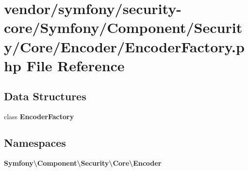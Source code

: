 \section{vendor/symfony/security-\/core/\+Symfony/\+Component/\+Security/\+Core/\+Encoder/\+Encoder\+Factory.php File Reference}
\label{_encoder_factory_8php}
\subsection*{Data Structures}
\begin{DoxyCompactItemize}
\item 
class {\bf Encoder\+Factory}
\end{DoxyCompactItemize}
\subsection*{Namespaces}
\begin{DoxyCompactItemize}
\item 
 {\bf Symfony\textbackslash{}\+Component\textbackslash{}\+Security\textbackslash{}\+Core\textbackslash{}\+Encoder}
\end{DoxyCompactItemize}
